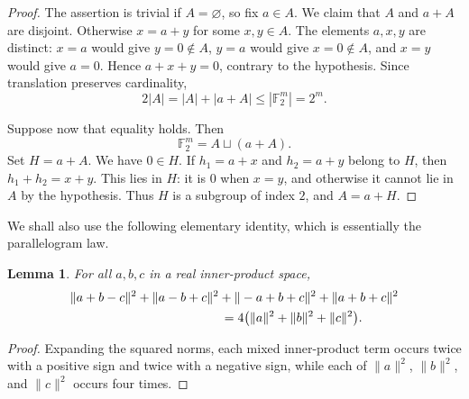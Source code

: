 \documentclass[11pt,reqno]{amsart}
\newtheorem{lemma}[theorem]{Lemma}
\theoremstyle{definition}
\newcommand{\F}{\mathbb F}
\newcommand{\0}{\mbf 0}%
\begin{document}
\begin{proof}
The assertion is trivial if $A=\varnothing$, so fix $a\in A$. We claim that
$A$ and $a+A$ are disjoint. Otherwise $x=a+y$ for some $x,y\in A$. The
elements $a,x,y$ are distinct: $x=a$ would give $y=0\notin A$, $y=a$ would
give $x=0\notin A$, and $x=y$ would give $a=0$. Hence $a+x+y=0$, contrary
to the hypothesis. Since translation preserves cardinality,
$$
 2|A|=|A|+|a+A|\le |\F_2^m|=2^m.
$$

Suppose now that equality holds. Then
$$
 \F_2^m=A\sqcup(a+A).
$$
Set $H=a+A$. We have $0\in H$. If $h_1=a+x$ and $h_2=a+y$ belong to $H$,
then $h_1+h_2=x+y$. This lies in $H$: it is $0$ when $x=y$, and otherwise
it cannot lie in $A$ by the hypothesis. Thus $H$ is a subgroup of index $2$,
and $A=a+H$.
\end{proof}

We shall also use the following elementary identity, which is essentially the parallelogram law.

\begin{lemma}\label{lem:four-sign}
For all $a,b,c$ in a real inner-product space,
\begin{align*}
 &\|a+b-c\|^2+\|a-b+c\|^2
   +\|-a+b+c\|^2+\|a+b+c\|^2 \\
 &\hspace{42mm}=4\bigl(\|a\|^2+\|b\|^2+\|c\|^2\bigr).
\end{align*}
\end{lemma}

\begin{proof}
Expanding the squared norms, each mixed inner-product term occurs twice with a
positive sign and twice with a negative sign, while each of $\|a\|^2$,
$\|b\|^2$, and $\|c\|^2$ occurs four times.
\end{proof}
\end{document}

